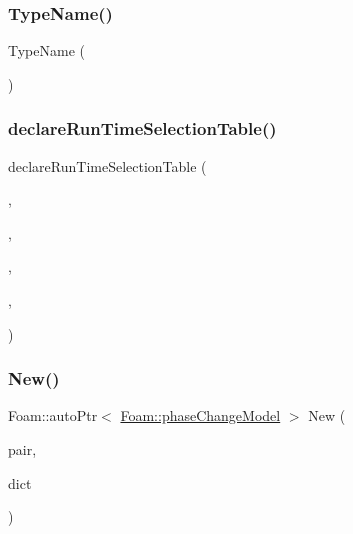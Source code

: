 \subsubsection{\texorpdfstring{Type\+Name()}{TypeName()}}
{\footnotesize\ttfamily Type\+Name (\begin{DoxyParamCaption}\item[{\char`\"{}phase\+Change\+Model\char`\"{}}]{ }\end{DoxyParamCaption})}

\mbox{\label{classFoam_1_1phaseChangeModel_a635dec53aec936a330f79b517549fad3}} 
\subsubsection{\texorpdfstring{declare\+Run\+Time\+Selection\+Table()}{declareRunTimeSelectionTable()}}
{\footnotesize\ttfamily declare\+Run\+Time\+Selection\+Table (\begin{DoxyParamCaption}\item[{auto\+Ptr}]{,  }\item[{\hyperlink{classFoam_1_1phaseChangeModel}{phase\+Change\+Model}}]{,  }\item[{phase\+Change\+Models}]{,  }\item[{(\hyperlink{classFoam_1_1FFPair}{F\+F\+Pair} \&\hyperlink{classFoam_1_1phaseChangeModel_a826deac453e9ba7c6fcda90d7b6b7709}{pair}, const dictionary \&dict)}]{,  }\item[{(\hyperlink{classFoam_1_1phaseChangeModel_a826deac453e9ba7c6fcda90d7b6b7709}{pair}, dict)}]{ }\end{DoxyParamCaption})}

\mbox{\label{classFoam_1_1phaseChangeModel_a1b699138c52c74753235bcd814ee7bb0}} 
\subsubsection{\texorpdfstring{New()}{New()}}
{\footnotesize\ttfamily Foam\+::auto\+Ptr$<$ \hyperlink{classFoam_1_1phaseChangeModel}{Foam\+::phase\+Change\+Model} $>$ New (\begin{DoxyParamCaption}\item[{\hyperlink{classFoam_1_1FFPair}{F\+F\+Pair} \&}]{pair,  }\item[{const dictionary \&}]{dict }\end{DoxyParamCaption})\hspace{0.3cm}{\ttfamily [static]}}



